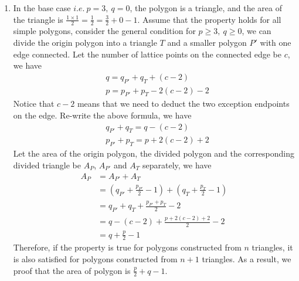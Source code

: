 \documentclass[a4paper,12pt]{article}
\begin{document}
\begin{enumerate}
\item{
In the base case $i.e.\ p=3, \ q = 0$, the polygon is a triangle, and the area of the triangle is $\frac{1\times 1}{2} = \frac{1}{2} = \frac{3}{2} + 0 - 1$. Assume that the property holds for all simple polygons, consider the general condition for $p \geq 3,\ q \geq 0$, we can divide the origin polygon into a triangle $T$ and a smaller polygon $P'$ with one edge connected. Let the number of lattice points on the connected edge be $c$, we have
\[
\begin{split}
    & q = q_{P'}+q_{T}+(c-2) \\
    & p = p_{P'} + p_{T} - 2(c-2) - 2
\end{split}
\]
Notice that $c-2$ means that we need to deduct the two exception endpoints on the edge. Re-write the above formula, we have
\[
\begin{split}
    & q_{P'}+q_{T} = q - (c-2) \\
    & p_{P'} + p_{T} = p + 2(c-2) + 2
\end{split}
\]
Let the area of the origin polygon, the divided polygon and the corresponding divided triangle be $A_P$, $A_{P'}$ and $A_T$ separately, we have 
\[
\begin{split}
    A_{P} & = A_{P'} + A_T \\
    & = (q_{P'} + \frac{p_{P'}}{2} - 1) + (q_T + \frac{p_T}{2} - 1) \\
    & = q_{P'} + q_T + \frac{p_{P'}+p_T}{2} - 2 \\
    & = q - (c-2) + \frac{p+2(c-2)+2}{2} - 2 \\
    & = q + \frac{p}{2} - 1
\end{split}
\]
Therefore, if the property is true for polygons constructed from $n$ triangles, it is also satisfied for polygons constructed from $n+1$ triangles. As a result, we proof that the area of polygon is $\frac{p}{2}+q-1$.
}


\end{enumerate}
\end{document}
